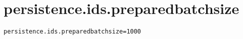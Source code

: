 \section{persistence.ids.preparedbatchsize}
\label{configuration:PersistenceIdsPreparedbatchsize}
\ClearAPI
\TODO
{}
\begin{lstlisting}[style=Props,caption={Usage example for \textit{persistence.ids.preparedbatchsize}}]
persistence.ids.preparedbatchsize=1000
\end{lstlisting}